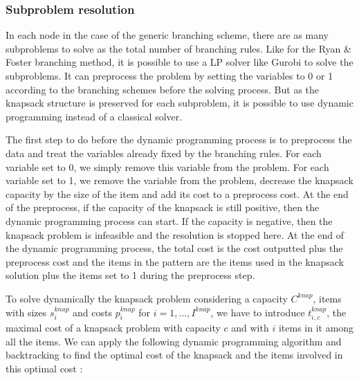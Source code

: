 \subsubsection{Subproblem resolution}
\label{generic_sp}

In each node in the case of the generic branching scheme, there are as many subproblems to solve as the total number of branching rules. Like for the Ryan \& Foster branching method, it is possible to use a LP solver like Gurobi to solve the subproblems. It can preprocess the problem by setting the variables to 0 or 1 according to the branching schemes before the solving process. But as the knapsack structure is preserved for each subproblem, it is possible to use dynamic programming instead of a classical solver. 

The first step to do before the dynamic programming process is to preprocess the data and treat the variables already fixed by the branching rules. For each variable set to 0, we simply remove this variable from the problem. For each variable set to 1, we remove the variable from the problem, decrease the knapsack capacity by the size of the item and add its cost to a preprocess cost. At the end of the preprocess, if the capacity of the knapsack is still positive, then the dynamic programming process can start. If the capacity is negative, then the knapsack problem is infeasible and the resolution is stopped here. At the end of the dynamic programming process, the total cost is the cost outputted plus the preprocess cost and the items in the pattern are the items used in the knapsack solution plus the items set to 1 during the preprocess step.

To solve dynamically the knapsack problem considering a capacity $C^{knap}$, items with sizes $s_i^{knap}$ and costs $p_i^{knap}$ for $i=1,\dots, I^{knap}$, we have to introduce $t_{i,c}^{knap}$, the maximal cost of a knapsack problem with capacity $c$ and with $i$ items in it among all the items. We can apply the following dynamic programming algorithm and backtracking to find the optimal cost of the knapsack and the items involved in this optimal cost : 

